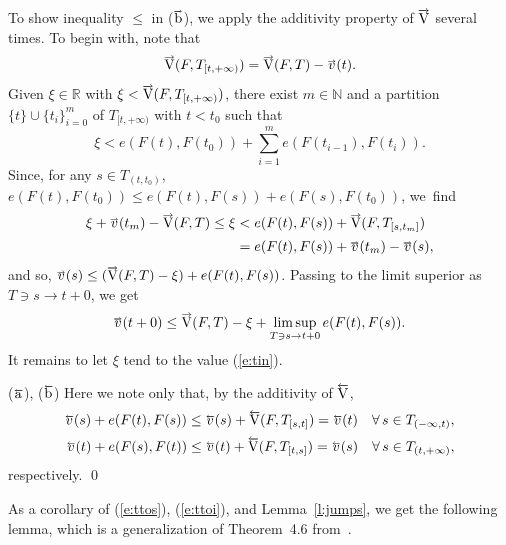 \documentclass[preprint,12pt]{elsarticle}
\newcommand{\eq}[1]{\mbox{\rm(\ref{#1})}}
\newcommand{\Rb}{\mathbb{R}}  \newcommand{\Nb}{\mathbb{N}}
\newcommand{\riV}{{\scriptstyle\overrightarrow{\mbox{\rm V}}}}
\newcommand{\leV}{{\scriptstyle\overleftarrow{\mbox{\rm V}}}}
\newcommand{\ori}[1]{{\scriptscriptstyle\overrightarrow{\mbox{$#1$}}}}
\newcommand{\ole}[1]{{\scriptscriptstyle\overleftarrow{\mbox{$#1$}}}}
\begin{document}
\begin{pf}
To show inequality $\le$ in ($\ori{\mbox{\rm b}}$), we apply the additivity property
of $\riV$ several times. To begin with, note that
  \begin{equation} \label{e:tin}
\riV(F,T_{[t,+\infty)})=\riV(F,T)-\ori{v}(t).
  \end{equation}
Given $\xi\in\Rb$ with $\xi<\riV(F,T_{[t,+\infty)})$, there exist $m\in\Nb$ and a
partition $\{t\}\cup\{t_i\}_{i=0}^m$ of $T_{[t,+\infty)}$ with $t<t_0$ such that
  \begin{equation*}
\xi<e(F(t),F(t_0))+\sum_{i=1}^m e(F(t_{i-1}),F(t_i)).
  \end{equation*}
Since, for any $s\!\in\! T_{(t,t_0)}$, $e(F(t),F(t_0))\!\le\! e(F(t),F(s))\!+\!e(F(s),F(t_0))$,
we~find
  \begin{align*}
\xi+\ori{v}(t_m)-\riV(F,T)\le\xi&<e(F(t),F(s))+\riV(F,T_{[s,t_m]})\\[2pt]
&=e(F(t),F(s))+\ori{v}(t_m)-\ori{v}(s),
  \end{align*}
and so, $\ori{v}(s)\le(\riV(F,T)-\xi)+e(F(t),F(s))$. Passing to the limit superior as
$T\ni s\to t+0$, we get
  \begin{equation*}
\ori{v}(t+0)\le\riV(F,T)-\xi+\limsup_{T\ni s\to t+0}e(F(t),F(s)).
  \end{equation*}
It remains to let $\xi$ tend to the value \eq{e:tin}.

\smallbreak
($\ole{\mbox{\rm a}}$), ($\ole{\mbox{\rm b}}$)
Here we note only that, by the additivity of $\leV$,
  \begin{align*}
\ole{v}(s)+e(F(t),F(s))\le\ole{v}(s)+\leV(F,T_{[s,t]})=\ole{v}(t)\quad
  \forall\,s\in T_{(-\infty,t)},\\[2pt]
\ole{v}(t)+e(F(s),F(t))\le\ole{v}(t)+\leV(F,T_{[t,s]})=\ole{v}(s)\quad
  \forall\,s\in T_{(t,+\infty)},
  \end{align*}
respectively.
\qed\end{pf}

As a corollary of \eq{e:ttos}, \eq{e:ttoi}, and Lemma~\ref{l:jumps}, we get the
following lemma, which is a generalization of Theorem~4.6 from~\cite{MatSb}.
\end{document}
